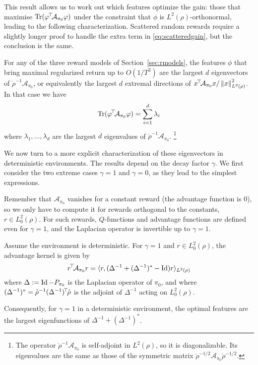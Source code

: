 \documentclass[11pt,a4paper]{article}
\newcommand{\AK}{\mathcal{A}}
\newcommand{\drho}{\grave \rho}
\begin{document}
This result allows us to work out which features optimize the gain: those
that maximise $\Tr(\transp{\phi}\AK_{\pi_0}\phi)$ under the constraint
that $\phi$ is $L^2(\rho)$-orthonormal, leading to the following
characterization.  Scattered random rewards
require a slightly longer proof to handle the extra term in
\eqref{eq:scatteredgain}, but the conclusion is the same.

\begin{cor}
\label{cor:optfeatures}
For any of the three reward models of Section~\ref{sec:rmodels}, the
features $\phi$ that bring maximal regularized return up to $O(1/T^2)$ are
the largest $d$ eigenvectors of $\drho^{-1}\AK_{\pi_0}$, or equivalently
the
largest $d$ extremal directions of
$\transp{x}\AK_{\pi_0}x/\norm{x}^2_{L^2(\rho)}$.
In that case we have
\begin{equation}
\Tr(\transp{\phi}\AK_{\pi_0} \phi)=\sum_{i=1}^d \lambda_i
\end{equation}
where $\lambda_1,\ldots,\lambda_d$ are the largest $d$ eigenvalues of
$\drho^{-1}\AK_{\pi_0}$. \footnote{The operator $\drho^{-1}\AK_{\pi_0}$ is
self-adjoint in $L^2(\rho)$, so it is diagonalizable. Its eigenvalues are
the same as those of the symmetric matrix $\drho^{-1/2}\AK_{\pi_0}\drho^{-1/2}$.}
\end{cor}

We now turn to a more explicit characterization of these eigenvectors 
in deterministic environments. The results depend on the
decay factor $\gamma$. We first consider the two extreme cases $\gamma=1$
and $\gamma=0$, as they lead to the simplest expressions.

Remember that $\AK_{\pi_0}$ vanishes for a constant reward (the advantage
function is $0$), so we only have to compute it for rewards orthogonal to
the constants, $r\in L^2_0(\rho)$. For such rewards, $Q$-functions and
advantage functions are defined even for $\gamma=1$, and the Laplacian
operator is invertible up to $\gamma=1$.

\begin{thm}[ (Optimal features for $\gamma=1$ in a
deterministic environment)]
\label{thm:lap}
Assume the environment is deterministic.
For $\gamma=1$ and $r\in L_0^2(\rho)$, the advantage kernel is given by
\begin{equation}
\transp{r}\AK_{\pi_0}r
=\langle r, (\Delta^{-1}+(\Delta^{-1})^\ast-\Id)r\rangle_{L^2(\rho)}
\end{equation}
where $\Delta\mathrel{\mathop{:}}= \operatorname{Id}-P_{\pi_0}$ is the Laplacian operator of $\pi_0$,
and where $(\Delta^{-1})^\ast=\drho^{-1}\transp{(\Delta^{-1})}\drho$ is the adjoint of $\Delta^{-1}$ acting on
$L^2_0(\rho)$.

Consequently, for $\gamma=1$ in a deterministic environment, the optimal features are the largest
eigenfunctions of $\Delta^{-1}+(\Delta^{-1})^\ast$.
\end{thm}
\end{document}
